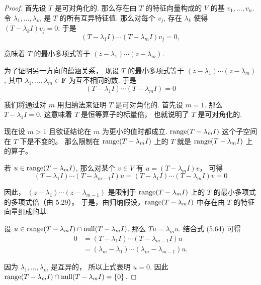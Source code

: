\begin{proof}
    首先设 \(T\) 是可对角化的. 那么存在由 \(T\) 的特征向量构成的 \(V\) 的基 \(v_1, \ldots, v_n\). 令 \(\lambda_1, \ldots, \lambda_m\) 是 \(T\) 的所有互异特征值. 那么对每个 \(v_j\), 存在 \(\lambda_k\) 使得 \((T - \lambda_k I)v_j = 0\). 于是
    \[(T - \lambda_1 I) \cdots (T - \lambda_m I)v_j = 0,\]

    意味着 \(T\) 的最小多项式等于 \((z - \lambda_1) \cdots (z - \lambda_m)\).

    为了证明另一方向的蕴涵关系，
    现设 \(T\) 的最小多项式等于 \((z - \lambda_1) \cdots (z - \lambda_m)\), 其中 \(\lambda_1, \ldots, \lambda_m \in \mathbf{F}\) 为互不相同的数. 于是
    \[(T - \lambda_1 I) \cdots (T - \lambda_m I) = 0\]

    我们将通过对 \(m\) 用归纳法来证明 \(T\) 是可对角化的. 首先设 \(m = 1\). 那么 \(T - \lambda_1 I = 0\), 这意味着 \(T\) 是恒等算子的标量倍，
    也就说明了 \(T\) 是可对角化的.

    现在设 \(m > 1\) 且欲证结论在 \(m\) 为更小的值时都成立. \(\operatorname{range}(T - \lambda_m I)\) 这个子空间在 \(T\) 下是不变的。
    那么限制在 \(\operatorname{range}(T - \lambda_m I)\) 上的 \(T\) 就是 \(\operatorname{range}(T - \lambda_m I)\) 上的算子。

    若 \(u \in \operatorname{range}(T - \lambda_m I)\), 那么对某个 \(v \in V\) 有 \(u = (T - \lambda_m I)v\)，
    可得
    \[(T - \lambda_1 I) \cdots (T - \lambda_{m-1} I)u = (T - \lambda_1 I) \cdots (T - \lambda_m I)v = 0\]

    因此，
    \((z - \lambda_1) \cdots (z - \lambda_{m-1})\) 是限制于 \(\operatorname{range}(T - \lambda_m I)\) 上的 \(T\) 的最小多项式的多项式倍（由 5.29）。
    于是，由归纳假设，\(\operatorname{range}(T - \lambda_m I)\) 中存在由 \(T\) 的特征向量组成的基.

    设 \(u \in \operatorname{range}(T - \lambda_m I) \cap \operatorname{null}(T - \lambda_m I)\). 那么 \(Tu = \lambda_m u\). 结合式 (5.64) 可得
    \begin{align}
        0 &= (T - \lambda_1 I) \cdots (T - \lambda_{m-1} I)u \\ &= (\lambda_m - \lambda_1) \cdots (\lambda_m - \lambda_{m-1})u.
    \end{align}

    因为 \(\lambda_1, \ldots, \lambda_m\) 是互异的，
    所以上式表明 \(u = 0\). 因此 \(\operatorname{range}(T - \lambda_m I) \cap \operatorname{null}(T - \lambda_m I) = \{0\}\).

\end{proof}
